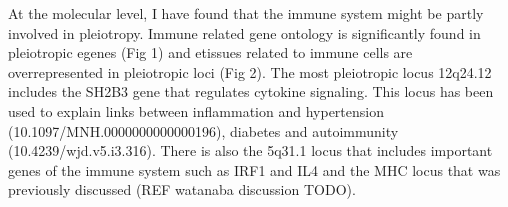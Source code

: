 


At the molecular level, I have found that the immune system might be partly involved in pleiotropy.
%
Immune related gene ontology is significantly found in pleiotropic egenes (Fig 1) and etissues related to immune cells are overrepresented in pleiotropic loci (Fig 2).
%
The most pleiotropic locus 12q24.12 includes the SH2B3 gene that regulates cytokine signaling.
%
This locus has been used to explain links between inflammation and hypertension (10.1097/MNH.0000000000000196), diabetes and autoimmunity (10.4239/wjd.v5.i3.316).
%
There is also the 5q31.1 locus that includes important genes of the immune system such as IRF1 and IL4 and the MHC locus that was previously discussed (REF watanaba discussion TODO).



%
%
%
%

